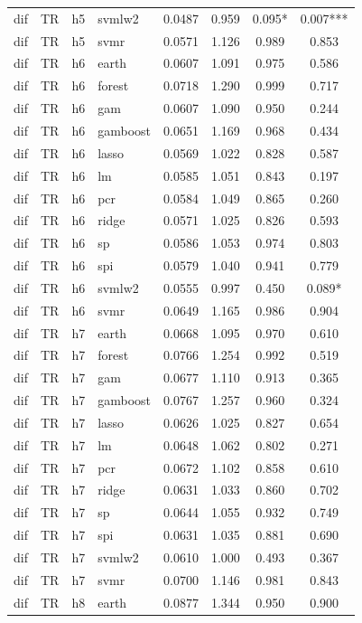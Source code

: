 \begin{ThreePartTable}
\begin{longtable}[t]{llclcccc}
dif & TR & h5 & svmlw2 & 0.0487 & 0.959 & 0.095* & 0.007***\\
dif & TR & h5 & svmr & 0.0571 & 1.126 & 0.989 & 0.853\\
\addlinespace
dif & TR & h6 & earth & 0.0607 & 1.091 & 0.975 & 0.586\\
dif & TR & h6 & forest & 0.0718 & 1.290 & 0.999 & 0.717\\
dif & TR & h6 & gam & 0.0607 & 1.090 & 0.950 & 0.244\\
dif & TR & h6 & gamboost & 0.0651 & 1.169 & 0.968 & 0.434\\
dif & TR & h6 & lasso & 0.0569 & 1.022 & 0.828 & 0.587\\
dif & TR & h6 & lm & 0.0585 & 1.051 & 0.843 & 0.197\\
dif & TR & h6 & pcr & 0.0584 & 1.049 & 0.865 & 0.260\\
dif & TR & h6 & ridge & 0.0571 & 1.025 & 0.826 & 0.593\\
dif & TR & h6 & sp & 0.0586 & 1.053 & 0.974 & 0.803\\
dif & TR & h6 & spi & 0.0579 & 1.040 & 0.941 & 0.779\\
dif & TR & h6 & svmlw2 & 0.0555 & 0.997 & 0.450 & 0.089*\\
dif & TR & h6 & svmr & 0.0649 & 1.165 & 0.986 & 0.904\\
\addlinespace
dif & TR & h7 & earth & 0.0668 & 1.095 & 0.970 & 0.610\\
dif & TR & h7 & forest & 0.0766 & 1.254 & 0.992 & 0.519\\
dif & TR & h7 & gam & 0.0677 & 1.110 & 0.913 & 0.365\\
dif & TR & h7 & gamboost & 0.0767 & 1.257 & 0.960 & 0.324\\
dif & TR & h7 & lasso & 0.0626 & 1.025 & 0.827 & 0.654\\
dif & TR & h7 & lm & 0.0648 & 1.062 & 0.802 & 0.271\\
dif & TR & h7 & pcr & 0.0672 & 1.102 & 0.858 & 0.610\\
dif & TR & h7 & ridge & 0.0631 & 1.033 & 0.860 & 0.702\\
dif & TR & h7 & sp & 0.0644 & 1.055 & 0.932 & 0.749\\
dif & TR & h7 & spi & 0.0631 & 1.035 & 0.881 & 0.690\\
dif & TR & h7 & svmlw2 & 0.0610 & 1.000 & 0.493 & 0.367\\
dif & TR & h7 & svmr & 0.0700 & 1.146 & 0.981 & 0.843\\
\addlinespace
dif & TR & h8 & earth & 0.0877 & 1.344 & 0.950 & 0.900\\

\end{longtable}
\end{ThreePartTable}
